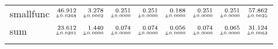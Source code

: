 \documentclass[a4paper,UKenglish]{lipics-v2016}
\begin{document}
\begin{table*}
\begin{adjustbox}{width=1.2\textwidth,center}
\begin{tabular}{lrrrrrrrr}
smallfunc&$\substack{\mathmakebox[.7cm][r]{46.912}\\{\mathmakebox[.7cm][r]{\scriptscriptstyle \pm 0.0368}}}$&$\substack{\mathmakebox[.7cm][r]{3.278}\\{\mathmakebox[.7cm][r]{\scriptscriptstyle \pm 0.0002}}}$&$\substack{\mathmakebox[.7cm][r]{0.251}\\{\mathmakebox[.7cm][r]{\scriptscriptstyle \pm 0.0000}}}$&$\substack{\mathmakebox[.7cm][r]{0.251}\\{\mathmakebox[.7cm][r]{\scriptscriptstyle \pm 0.0000}}}$&$\substack{\mathmakebox[.7cm][r]{0.188}\\{\mathmakebox[.7cm][r]{\scriptscriptstyle \pm 0.0000}}}$&$\substack{\mathmakebox[.7cm][r]{0.251}\\{\mathmakebox[.7cm][r]{\scriptscriptstyle \pm 0.0000}}}$&$\substack{\mathmakebox[.7cm][r]{0.251}\\{\mathmakebox[.7cm][r]{\scriptscriptstyle \pm 0.0000}}}$&$\substack{\mathmakebox[.7cm][r]{57.862}\\{\mathmakebox[.7cm][r]{\scriptscriptstyle \pm 0.0025}}}$\\
\addlinespace
sum&$\substack{\mathmakebox[.7cm][r]{23.612}\\{\mathmakebox[.7cm][r]{\scriptscriptstyle \pm 0.0201}}}$&$\substack{\mathmakebox[.7cm][r]{1.440}\\{\mathmakebox[.7cm][r]{\scriptscriptstyle \pm 0.0000}}}$&$\substack{\mathmakebox[.7cm][r]{0.074}\\{\mathmakebox[.7cm][r]{\scriptscriptstyle \pm 0.0000}}}$&$\substack{\mathmakebox[.7cm][r]{0.074}\\{\mathmakebox[.7cm][r]{\scriptscriptstyle \pm 0.0000}}}$&$\substack{\mathmakebox[.7cm][r]{0.056}\\{\mathmakebox[.7cm][r]{\scriptscriptstyle \pm 0.0000}}}$&$\substack{\mathmakebox[.7cm][r]{0.074}\\{\mathmakebox[.7cm][r]{\scriptscriptstyle \pm 0.0000}}}$&$\substack{\mathmakebox[.7cm][r]{0.065}\\{\mathmakebox[.7cm][r]{\scriptscriptstyle \pm 0.0000}}}$&$\substack{\mathmakebox[.7cm][r]{31.124}\\{\mathmakebox[.7cm][r]{\scriptscriptstyle \pm 0.0063}}}$\\
\addlinespace

\end{tabular}
\end{adjustbox}
\end{table*}
\end{document}
